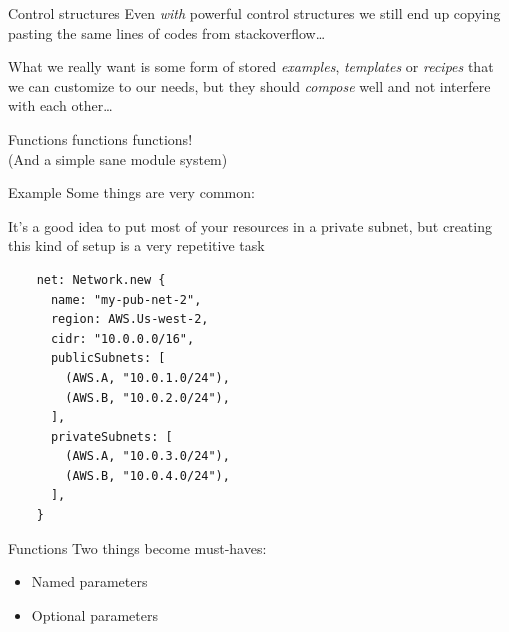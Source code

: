 \documentclass[aspectratio=169,20pt]{beamer}
\newcommand{\vspaced}{
    \vspace{5mm}
}
\newcommand{\chapterslide}[1]{
    {
        \begin{frame}[plain]
        \begin{center}
        \large{#1}
        \end{center}
        \end{frame}
    }
}
\begin{document}
\begin{frame}{Control structures}
    Even \emph{with} powerful control structures we still end up copying
    pasting the same lines of codes from stackoverflow\ldots
\end{frame}

\begin{frame}
    What we really want is some form of stored \emph{examples}, \emph{templates}
    or \emph{recipes} that we can customize to our needs, but they should
    \emph{compose} well and not interfere with each other\ldots
\end{frame}

\chapterslide{Functions functions functions! \\
\small{(And a simple sane module system)}}

\begin{frame}{Example}
    Some things are very common: \\
    \vspaced
    It's a good idea to put most of your resources in a private subnet, but
    creating this kind of setup is a very repetitive task
\end{frame}

\begin{frame}[fragile]
    \begin{lstlisting}
    net: Network.new {
      name: "my-pub-net-2",
      region: AWS.Us-west-2,
      cidr: "10.0.0.0/16",
      publicSubnets: [
        (AWS.A, "10.0.1.0/24"),
        (AWS.B, "10.0.2.0/24"),
      ],
      privateSubnets: [
        (AWS.A, "10.0.3.0/24"),
        (AWS.B, "10.0.4.0/24"),
      ],
    }
    \end{lstlisting}
\end{frame}

\begin{frame}{Functions}
    Two things become must-haves: \\
    \vspaced
    \begin{itemize}
    \item Named parameters
    \item Optional parameters
    \end{itemize}
\end{frame}
\end{document}
